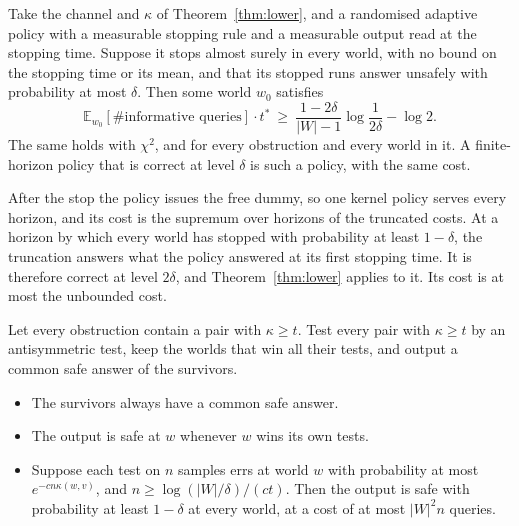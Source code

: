 \begin{theorem}
\label{thm:lowerstop}
Take the channel and $\kappa$ of Theorem~\ref{thm:lower}, and a randomised adaptive policy with
a measurable stopping rule and a measurable output read at the stopping time. Suppose it stops
almost surely in every world, with no bound on the stopping time or its mean, and that its
stopped runs answer unsafely with probability at most $\delta$. Then some world $w_{0}$ satisfies
\[
\mathbb{E}_{w_{0}}[\#\text{informative queries}]\cdot t^{*}\ \ge\
\frac{1-2\delta}{|W|-1}\log\frac1{2\delta}-\log2 .
\]
The same holds with $\chi^{2}$, and for every obstruction and every world in it. A finite-horizon
policy that is correct at level $\delta$ is such a policy, with the same cost.
\end{theorem}


After the stop the policy issues the free dummy, so one kernel policy serves every horizon, and
its cost is the supremum over horizons of the truncated costs. At a horizon by which every world
has stopped with probability at least $1-\delta$, the truncation answers what the policy answered
at its first stopping time. It is therefore correct at level $2\delta$, and
Theorem~\ref{thm:lower} applies to it. Its cost is at most the unbounded cost.

\begin{theorem}
\label{thm:upper}
Let every obstruction contain a pair with $\kappa\ge t$. Test every pair with $\kappa\ge t$ by
an antisymmetric test, keep the worlds that win all their tests, and output a common safe
answer of the survivors.
\begin{itemize}
\item The survivors always have a common safe answer.
\item The output is safe at $w$ whenever $w$ wins its own tests.
\item Suppose each test on $n$ samples errs at world $w$ with probability at most
$e^{-cn\kappa(w,v)}$, and $n\ge\log(|W|/\delta)/(ct)$. Then the output is safe with probability
at least $1-\delta$ at every world, at a cost of at most $|W|^{2}n$ queries.
\end{itemize}
\end{theorem}

